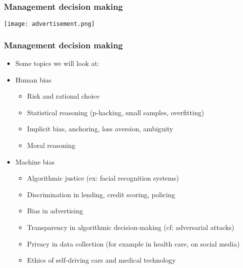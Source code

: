 \documentclass[xcolor=dvipsnames, 9pt]{beamer} %
\begin{document}
\begin{frame}
\frametitle{Management decision making}
\hspace{-0.5cm} \texttt{[image: advertisement.png]} 
\end{frame}

\begin{frame}
\frametitle{Management decision making}
\begin{itemize}
\item[] Some topics we will look at:
\item \textcolor{dark_red}{Human bias}
\begin{itemize}
\item Risk and rational choice
\item Statistical reasoning (p-hacking, small samples, overfitting)
\item Implicit bias, anchoring, loss aversion, ambiguity
\item Moral reasoning
\end{itemize}
\item \textcolor{dark_red}{Machine bias}
\begin{itemize}
\item Algorithmic justice  (ex: facial recognition systems)
\item Discrimination in lending, credit scoring, policing
\item Bias in advertising
\item Transparency in algorithmic decision-making (cf: adversarial attacks)
\item Privacy in data collection (for example in health care, on social media)
\item Ethics of self-driving cars and medical technology
\end{itemize}
\end{itemize}
\end{frame}
\end{document}

